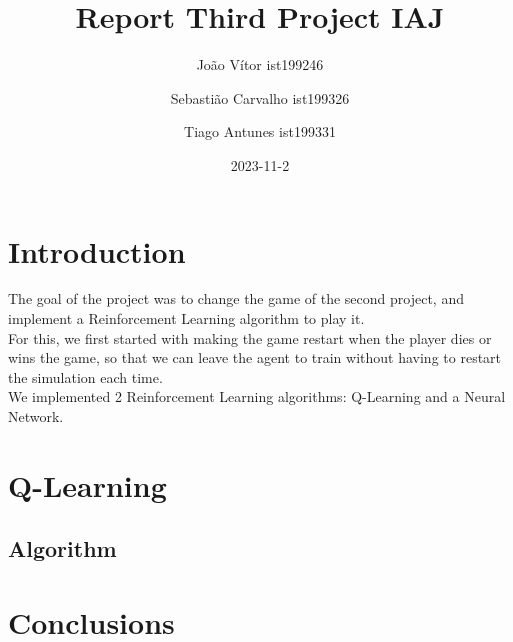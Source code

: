 \documentclass{article}
\title{Report Third Project IAJ}
\author{João Vítor ist199246
  \and Sebastião Carvalho ist199326
  \and Tiago Antunes ist199331}
\date{2023-11-2}
\begin{document}
  \maketitle
  \tableofcontents
  \newpage
  \section{Introduction}
  The goal of the project was to change the game of the second project, and implement a Reinforcement Learning algorithm to play it.\\
  For this, we first started with making the game restart when the player dies or wins the game, so that we can leave the agent to train
  without having to restart the simulation each time.\\
  We implemented 2 Reinforcement Learning algorithms: Q-Learning and a Neural Network.\\
  \section{Q-Learning}
  
  \subsection{Algorithm}

  \section{Conclusions}
  
\end{document}
